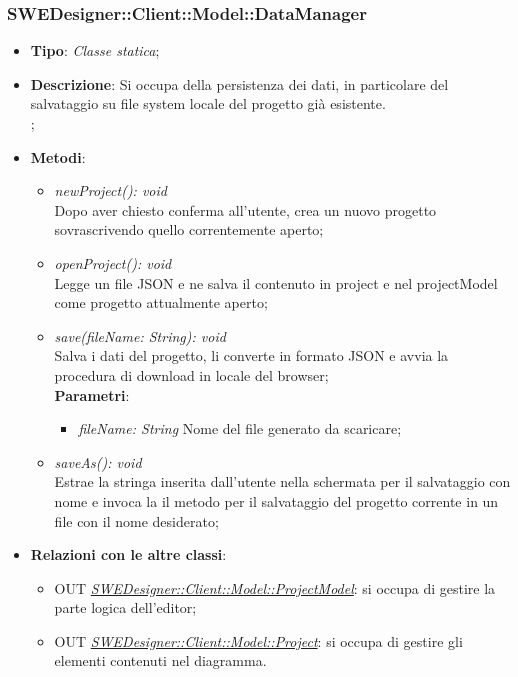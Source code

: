 \documentclass[../DefinizioneDiProdotto.tex]{subfiles}
\begin{document}
				\subsubsection{SWEDesigner::Client::Model::DataManager}
				\hypertarget{SWEDesigner::Client::Model::DataManager}{}
					\begin{itemize}
						\item \textbf{Tipo}: \emph{Classe statica};
						\item \textbf{Descrizione}: Si occupa della persistenza dei dati, in particolare del salvataggio su file system locale del progetto già esistente.\\;
						\item \textbf{Metodi}:
						\begin{itemize}
							\item \emph{newProject(): void} \\
							Dopo aver chiesto conferma all'utente, crea un nuovo progetto sovrascrivendo quello correntemente aperto; \\
							\item \emph{openProject(): void} \\
							Legge un file JSON e ne salva il contenuto in project e nel projectModel come progetto attualmente aperto; \\
							\item \emph{save(fileName: String): void} \\
							Salva i dati del progetto, li converte in formato JSON e avvia la procedura di download in locale del browser; \\
							\textbf{Parametri}:
							\begin{itemize}
								\item \emph{fileName: String}
								Nome del file generato da scaricare; \\
							\end{itemize}
							\item \emph{saveAs(): void}\\
							Estrae la stringa inserita dall'utente nella schermata per il salvataggio con nome e invoca la il metodo per il salvataggio del progetto corrente in un file con il nome desiderato; \\
						\end{itemize}
						\item \textbf{Relazioni con le altre classi}:
						\begin{itemize}
							\item OUT \hyperlink{SWEDesigner::Client::Model::ProjectModel}{\emph{SWEDesigner::Client::Model::ProjectModel}}: si occupa di gestire la parte logica dell'editor;
							\item OUT \hyperlink{SWEDesigner::Client::Model::Project}{\emph{SWEDesigner::Client::Model::Project}}: si occupa di gestire gli elementi contenuti nel diagramma.
						\end{itemize}
					\end{itemize}
\end{document}
